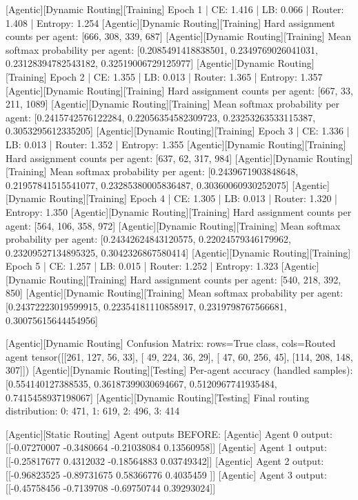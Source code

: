 [Agentic][Dynamic Routing][Training] Epoch 1 | CE: 1.416 | LB: 0.066 | Router: 1.408 | Entropy: 1.254
[Agentic][Dynamic Routing][Training] Hard assignment counts per agent: [666, 308, 339, 687]
[Agentic][Dynamic Routing][Training] Mean softmax probability per agent: [0.2085491418838501, 0.2349769026041031, 0.23128394782543182, 0.32519006729125977]
[Agentic][Dynamic Routing][Training] Epoch 2 | CE: 1.355 | LB: 0.013 | Router: 1.365 | Entropy: 1.357
[Agentic][Dynamic Routing][Training] Hard assignment counts per agent: [667, 33, 211, 1089]
[Agentic][Dynamic Routing][Training] Mean softmax probability per agent: [0.2415742576122284, 0.22056354582309723, 0.23253263533115387, 0.3053295612335205]
[Agentic][Dynamic Routing][Training] Epoch 3 | CE: 1.336 | LB: 0.013 | Router: 1.352 | Entropy: 1.355
[Agentic][Dynamic Routing][Training] Hard assignment counts per agent: [637, 62, 317, 984]
[Agentic][Dynamic Routing][Training] Mean softmax probability per agent: [0.2439671903848648, 0.21957841515541077, 0.23285380005836487, 0.30360060930252075]
[Agentic][Dynamic Routing][Training] Epoch 4 | CE: 1.305 | LB: 0.013 | Router: 1.320 | Entropy: 1.350
[Agentic][Dynamic Routing][Training] Hard assignment counts per agent: [564, 106, 358, 972]
[Agentic][Dynamic Routing][Training] Mean softmax probability per agent: [0.24342624843120575, 0.22024579346179962, 0.23209527134895325, 0.3042326867580414]
[Agentic][Dynamic Routing][Training] Epoch 5 | CE: 1.257 | LB: 0.015 | Router: 1.252 | Entropy: 1.323
[Agentic][Dynamic Routing][Training] Hard assignment counts per agent: [540, 218, 392, 850]
[Agentic][Dynamic Routing][Training] Mean softmax probability per agent: [0.24372223019599915, 0.22354181110858917, 0.2319798767566681, 0.30075615644454956]

[Agentic][Dynamic Routing] Confusion Matrix: rows=True class, cols=Routed agent
tensor([[261, 127,  56,  33],
[ 49, 224,  36,  29],
[ 47,  60, 256,  45],
[114, 208, 148, 307]])
[Agentic][Dynamic Routing][Testing] Per-agent accuracy (handled samples): [0.554140127388535, 0.36187399030694667, 0.5120967741935484, 0.7415458937198067]
[Agentic][Dynamic Routing][Testing] Final routing distribution: {0: 471, 1: 619, 2: 496, 3: 414}

[Agentic][Static Routing] Agent outputs BEFORE:
[Agentic] Agent 0 output: [[-0.07270007 -0.3480664  -0.21038084  0.13560958]]
[Agentic] Agent 1 output: [[-0.25817677  0.4312032  -0.18564883  0.03749342]]
[Agentic] Agent 2 output: [[-0.96823525 -0.89731675  0.58366776  0.4035459 ]]
[Agentic] Agent 3 output: [[-0.45758456 -0.7139708  -0.69750744  0.39293024]]

